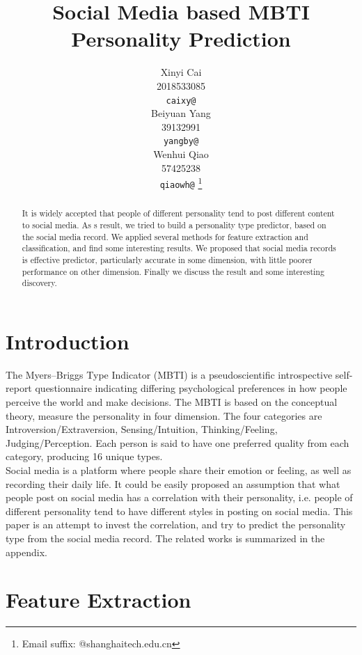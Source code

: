 \documentclass{article}
\title{Social Media based MBTI Personality Prediction}
\author{%
  Xinyi Cai\\
  2018533085\\
  \texttt{caixy@} \\
  \And
  Beiyuan Yang \\
  39132991 \\
  \texttt{yangby@} \\
  \And
  Wenhui Qiao \\
  57425238 \\
  \texttt{qiaowh@} \thanks{Email suffix: @shanghaitech.edu.cn} \\
}
\begin{document}
\maketitle

\begin{abstract}
It is widely accepted that people of different personality tend to post different content to social media. As s result, we tried to build a personality type predictor, based on the social media record. We applied several methods for feature extraction and classification, and find some interesting results. We proposed that social media records is effective predictor, particularly accurate in some dimension, with little poorer performance on other dimension. Finally we discuss the result and some interesting discovery.
\end{abstract}

\section{Introduction}
The Myers–Briggs Type Indicator (MBTI) is a pseudoscientific introspective self-report questionnaire indicating differing psychological preferences in how people perceive the world and make decisions. The MBTI is based on the conceptual theory, measure the personality in four dimension. The four categories are Introversion/Extraversion, Sensing/Intuition, Thinking/Feeling, Judging/Perception. Each person is said to have one preferred quality from each category, producing 16 unique types. \\
Social media is a platform where people share their emotion or feeling, as well as recording their daily life. It could be easily proposed an assumption that what people post on social media has a correlation with their personality, i.e. people of different personality tend to have different styles in posting on social media. This paper is an attempt to invest the correlation, and try to predict the personality type from the social media record. The related works is summarized in the appendix.


\section{Feature Extraction}
\end{document}
